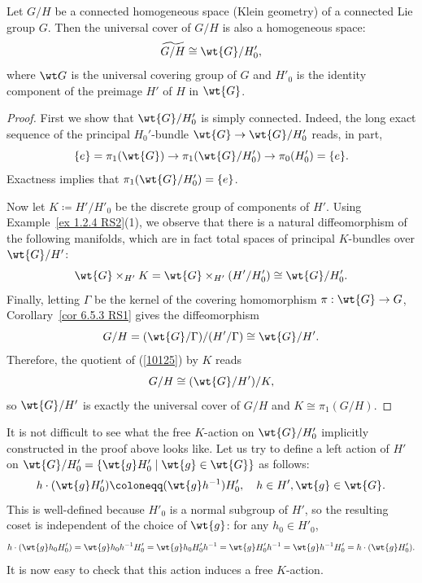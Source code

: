 \begin{lem}
    Let $G\slash H$ be a connected homogeneous space (Klein geometry) of a connected Lie group $G$. Then the universal cover of $G\slash H$ is also a homogeneous space:
    \[\widetilde{G\slash H}\cong \wt{G}\slash H'_0,\]
    where $\wt G$ is the universal covering group of $G$ and $H'_0$ is the identity component of the preimage $H'$ of $H$ in $\wt{G}$.
\end{lem}
\begin{proof}
    First we show that $\wt{G}\slash H'_0$ is simply connected. Indeed, the long exact sequence of the principal $H_0'$-bundle $\wt{G}\to \wt{G}\slash H'_0$ reads, in part,
    \[\{e\}=\pi_1(\wt{G})\to \pi_1(\wt{G}\slash H_0')\to \pi_0(H_0')=\{e\}.\]
    Exactness implies that $\pi_1(\wt{G}\slash H_0')=\{e\}$.

    Now let $K\coloneqq H'\slash H'_0$ be the discrete group of components of $H'$. Using Example~\ref{ex 1.2.4 RS2}(1), we observe that there is a natural diffeomorphism of the following manifolds, which are in fact total spaces of principal $K$-bundles over $\wt{G}\slash H'$:
    \[\wt{G}\times_{H'}K=\wt{G}\times_{H'}(H'\slash H'_0)\cong \wt{G}\slash H'_0.\label{10125}\]
    Finally, letting $\Gamma$ be the kernel of the covering homomorphism $\pi:\wt{G}\to G$, Corollary~\ref{cor 6.5.3 RS1} gives the diffeomorphism
    \[G\slash H=(\wt{G}\slash \Gamma)\slash (H'\slash \Gamma)\cong \wt{G}\slash H'.\]
    Therefore, the quotient of (\ref{10125}) by $K$ reads
    \[G\slash H\cong (\wt{G}\slash H')\slash K,\]
    so $\wt{G}\slash H'$ is exactly the universal cover of $G\slash H$ and $K\cong \pi_1(G\slash H)$.
\end{proof}
\begin{rem}
    It is not difficult to see what the free $K$-action on $\wt{G}\slash H'_0$ implicitly constructed in the proof above  looks like. Let us try to define a left action of $H'$ on $\wt{G}\slash H'_0=\{\wt{g}H'_0\mid \wt{g}\in\wt{G}\}$ as follows:
    \[h\cdot (\wt{g} H'_0)\coloneqq (\wt{g}h^{-1})H'_0,\quad h\in H',\wt{g}\in \wt{G}.\]
    This is well-defined because $H'_0$ is a normal subgroup of $H'$, so the resulting coset is independent of the choice of $\wt{g}$: for any $h_0\in H'_0$,
    \[h\cdot (\wt{g}h_0H'_0)=\wt{g}h_0 h^{-1}H'_0=\wt{g}h_0H'_0h^{-1}=\wt{g}H'_0h^{-1}=\wt{g}h^{-1}H'_0=h\cdot (\wt{g}H'_0).\]
    It is now easy to check that this action induces a free $K$-action.
\end{rem}

